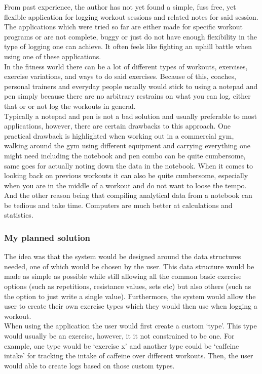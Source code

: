 \documentclass{article}
\newcommand{\vspaceconst}{-2ex}
\begin{document}
\begin{multicols}{2}
From past experience, the author has not yet found a simple, fuss free, yet flexible application for logging workout sessions and related notes for said session. The applications which were tried so far are either made for specific workout programs or are not complete, buggy or just do not have enough flexibility in the type of logging one can achieve. It often feels like fighting an uphill battle when using one of these applications.\\
In the fitness world there can be a lot of different types of workouts, exercises, exercise variations, and ways to do said exercises. Because of this, coaches, personal trainers and everyday people usually would stick to using a notepad and pen simply because there are no arbitrary restrains on what you can log, either that or or not log the workouts in general.\\
Typically a notepad and pen is not a bad solution and usually preferable to most applications, however, there are certain drawbacks to this approach. One practical drawback is highlighted when working out in a commercial gym, walking around the gym using different equipment and carrying everything one might need including the notebook and pen combo can be quite cumbersome, same goes for actually noting down the data in the notebook. When it comes to looking back on previous workouts it can also be quite cumbersome, especially when you are in the middle of a workout and do not want to loose the tempo. And the other reason being that compiling analytical data from a notebook can be tedious and take time. Computers are much better at calculations and statistics.\\

\subsubsection{My planned solution}
\vspace{\vspaceconst}

The idea was that the system would be designed around the data structures needed, one of which would be chosen by the user. This data structure would be made as simple as possible while still allowing all the common basic exercise options (such as repetitions, resistance values, sets etc) but also others (such as the option to just write a single value). Furthermore, the system would allow the user to create their own exercise types which they would then use when logging a workout.\\
When using the application the user would first create a custom `type'. This type would usually be an exercise, however, it it not constrained to be one. For example, one type would be `exercise x' and another type could be `caffeine intake' for tracking the intake of caffeine over different workouts. Then, the user would able to create logs based on those custom types.\\


\end{multicols}
\end{document}
